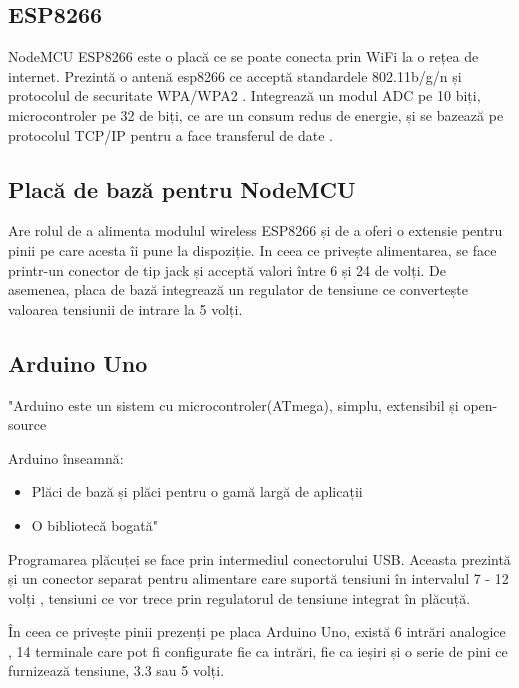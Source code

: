 \subsection{ESP8266}

	NodeMCU ESP8266 este o placă ce se poate conecta prin WiFi la o rețea de internet. Prezintă o antenă esp8266 ce acceptă standardele 802.11b/g/n și protocolul de securitate WPA/WPA2 \cite{esp8266}. Integrează un modul ADC pe 10 biți, microcontroler pe 32 de biți, ce are un consum redus de energie, și se bazează pe protocolul TCP/IP pentru a face transferul de date \cite{esp8266}.

\subsection{Placă de bază pentru NodeMCU}

	Are rolul de a alimenta modulul wireless ESP8266 și de a oferi o extensie pentru pinii pe care acesta îi pune la dispoziție. In ceea ce privește alimentarea, se face printr-un conector de tip jack și acceptă valori între 6 și 24 de volți. De asemenea, placa de bază integrează un regulator de tensiune ce convertește valoarea tensiunii de intrare la 5 volți.

\subsection{Arduino Uno}

	"Arduino este un sistem cu microcontroler(ATmega), simplu, extensibil și open-source

\vspace{1em}		

	Arduino înseamnă:
			\begin{itemize}
			\setlength{\itemindent}{2em}
			\itemsep0em
			\item Plăci de bază și plăci pentru o gamă largă de aplicații
			\item O bibliotecă bogată" \cite{arduino}
		\end{itemize}

	Programarea plăcuței se face prin intermediul conectorului USB. Aceasta prezintă și un conector separat pentru alimentare care suportă tensiuni în intervalul 7 - 12 volți \cite{arduino}, tensiuni ce vor trece prin regulatorul de tensiune integrat în plăcuță.

	În ceea ce privește pinii prezenți pe placa Arduino Uno, există 6 intrări analogice \cite{arduino}, 14 terminale care pot fi configurate fie ca intrări, fie ca ieșiri \cite{arduino} și o serie de pini ce furnizează tensiune, 3.3 sau 5 volți.

